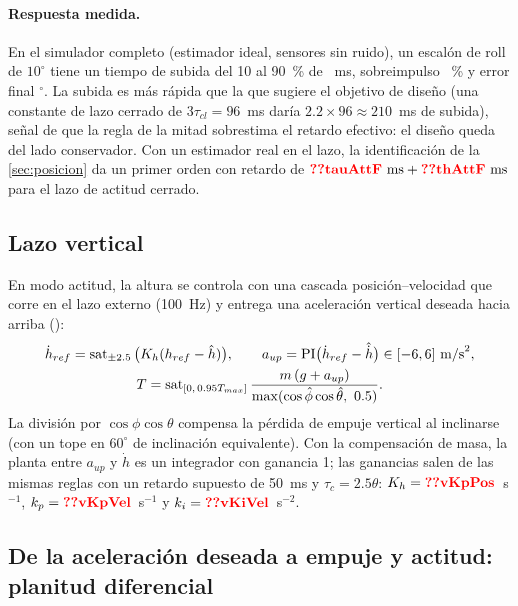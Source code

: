 \paragraph{Respuesta medida.} En el simulador completo (estimador ideal,
sensores sin ruido), un escalón de roll de $10^\circ$ tiene un tiempo de
subida del 10 al 90~\% de ~ms, sobreimpulso
~\% y error final $^\circ$. La subida es más rápida
que la que sugiere el objetivo de diseño (una constante de lazo cerrado de
$3\tau_{cl}=96$~ms daría $2.2\times96\approx210$~ms de subida), señal de que la regla de la
mitad sobrestima el retardo efectivo: el diseño queda del lado conservador.
Con un estimador real en el lazo, la identificación de la
\cref{sec:posicion} da un primer orden con retardo de
$\val{tauAttF}~\text{ms}+\val{thAttF}~\text{ms}$ para el lazo de actitud
cerrado.

\subsection{Lazo vertical}

En modo actitud, la altura se controla con una cascada posición--velocidad
que corre en el lazo externo (100~Hz) y entrega una aceleración vertical
deseada hacia arriba ():
\begin{equation}
\begin{gathered}
\dot h_{ref}=\sat_{\pm2.5}\big(K_h(h_{ref}-\hat h)\big),\qquad
a_{up}=\text{PI}\big(\dot h_{ref}-\hat{\dot h}\big)\in[-6,6]~\text{m/s}^2,\\
T=\sat_{[0,\,0.95T_{max}]}\frac{m\,(g+a_{up})}{\max(\cos\hat\phi\cos\hat\theta,\ 0.5)} .
\end{gathered}
\label{eq:vertical}
\end{equation}
La división por $\cos\phi\cos\theta$ compensa la pérdida de empuje vertical
al inclinarse (con un tope en $60^\circ$ de inclinación equivalente). Con la
compensación de masa, la planta entre $a_{up}$ y $\dot h$ es un integrador
con ganancia 1; las ganancias salen de las mismas reglas con un retardo
supuesto de 50~ms y $\tau_c=2.5\theta$: $K_h=\val{vKpPos}$~s$^{-1}$,
$k_p=\val{vKpVel}$~s$^{-1}$ y $k_i=\val{vKiVel}$~s$^{-2}$.

\subsection{De la aceleración deseada a empuje y actitud: planitud diferencial}
\label{sec:planitud}

